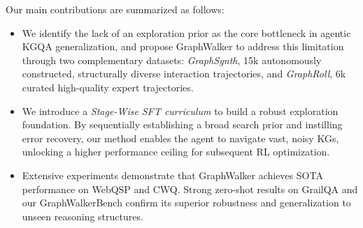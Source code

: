 
Our main contributions are summarized as follows:

\begin{itemize}[leftmargin=*]
    \vspace{-6pt}
    \item We identify the lack of an exploration prior as the core bottleneck in agentic KGQA generalization, and propose GraphWalker to address this limitation through two complementary datasets: \textit{GraphSynth}, 15k autonomously constructed, structurally diverse interaction trajectories, and \textit{GraphRoll}, 6k curated high-quality expert trajectories.
    
    \item We introduce a \textit{Stage-Wise SFT curriculum} to build a robust exploration foundation. By sequentially establishing a broad search prior and instilling error recovery, our method enables the agent to navigate vast, noisy KGs, unlocking a higher performance ceiling for subsequent RL optimization.
    
    \item Extensive experiments demonstrate that GraphWalker achieves SOTA performance on WebQSP and CWQ. Strong zero-shot results on GrailQA and our GraphWalkerBench confirm its superior robustness and generalization to unseen reasoning structures.
\end{itemize}
